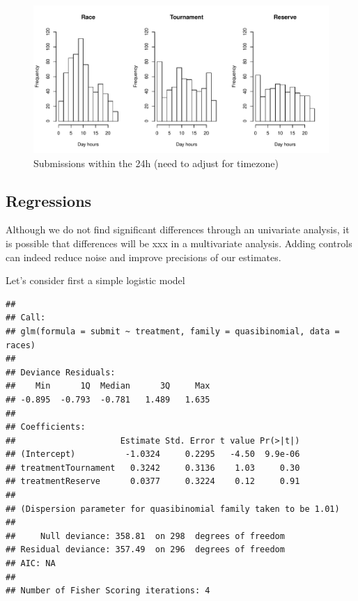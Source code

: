\documentclass[12pt,]{article}
\theoremstyle{plain} %
\begin{document}
\begin{figure}
\centering
\includegraphics{Figures/unnamed-chunk-18-1.pdf}
\caption{Submissions within the 24h (need to adjust for timezone)}
\end{figure}

\subsection{Regressions}\label{regressions}

Although we do not find significant differences through an univariate
analysis, it is possible that differences will be xxx in a multivariate
analysis. Adding controls can indeed reduce noise and improve precisions
of our estimates.

Let's consider first a simple logistic model

\begin{verbatim}
## 
## Call:
## glm(formula = submit ~ treatment, family = quasibinomial, data = races)
## 
## Deviance Residuals: 
##    Min      1Q  Median      3Q     Max  
## -0.895  -0.793  -0.781   1.489   1.635  
## 
## Coefficients:
##                     Estimate Std. Error t value Pr(>|t|)
## (Intercept)          -1.0324     0.2295   -4.50  9.9e-06
## treatmentTournament   0.3242     0.3136    1.03     0.30
## treatmentReserve      0.0377     0.3224    0.12     0.91
## 
## (Dispersion parameter for quasibinomial family taken to be 1.01)
## 
##     Null deviance: 358.81  on 298  degrees of freedom
## Residual deviance: 357.49  on 296  degrees of freedom
## AIC: NA
## 
## Number of Fisher Scoring iterations: 4
\end{verbatim}
\end{document}
